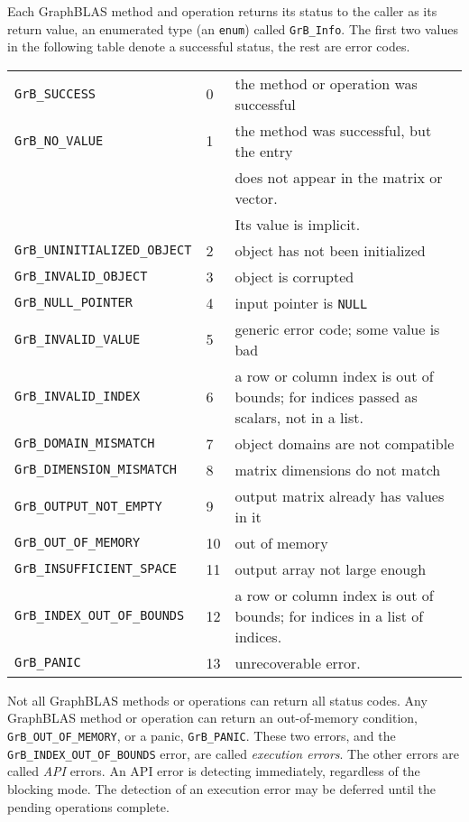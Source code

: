 \documentclass[12pt]{article}
\begin{document}
Each GraphBLAS method and operation returns its status to the caller as its
return value, an enumerated type (an \verb'enum') called \verb'GrB_Info'.  The
first two values in the following table denote a successful status, the rest
are error codes.

\vspace{0.2in}
\noindent
{\small
\begin{tabular}{llp{2.8in}}
\hline
\verb'GrB_SUCCESS'              & 0 & the method or operation was successful \\
\verb'GrB_NO_VALUE'             & 1 & the method was successful, but the entry \\
                                &   & does not appear in the matrix or vector. \\
                                &   & Its value is implicit. \\
\hline
\hline
\verb'GrB_UNINITIALIZED_OBJECT' & 2 & object has not been initialized \\
\verb'GrB_INVALID_OBJECT'       & 3 & object is corrupted \\
\verb'GrB_NULL_POINTER'         & 4 & input pointer is \verb'NULL' \\
\verb'GrB_INVALID_VALUE'        & 5 & generic error code; some value is bad \\
\verb'GrB_INVALID_INDEX'        & 6 & a row or column index is out of bounds;
                                      for indices passed as scalars, not in a list. \\
\verb'GrB_DOMAIN_MISMATCH'      & 7 & object domains are not compatible \\
\verb'GrB_DIMENSION_MISMATCH'   & 8 & matrix dimensions do not match \\
\verb'GrB_OUTPUT_NOT_EMPTY'     & 9 & output matrix already has values in it \\
\hline
\verb'GrB_OUT_OF_MEMORY'        & 10 & out of memory \\
\verb'GrB_INSUFFICIENT_SPACE'   & 11 & output array not large enough \\
\verb'GrB_INDEX_OUT_OF_BOUNDS'  & 12 & a row or column index is out of bounds;
                                  for indices in a list of indices. \\
\hline
\verb'GrB_PANIC'                & 13 & unrecoverable error.
\\
\hline
\end{tabular}
\vspace{0.2in}
}

Not all GraphBLAS methods or operations can return all status codes.  Any
GraphBLAS method or operation can return an out-of-memory condition,
\verb'GrB_OUT_OF_MEMORY', or a panic, \verb'GrB_PANIC'.  These two errors, and
the \verb'GrB_INDEX_OUT_OF_BOUNDS' error, are called {\em execution errors}.
The other errors are called {\em API} errors.  An API error is detecting
immediately, regardless of the blocking mode.  The detection of an execution
error may be deferred until the pending operations complete.
\end{document}
